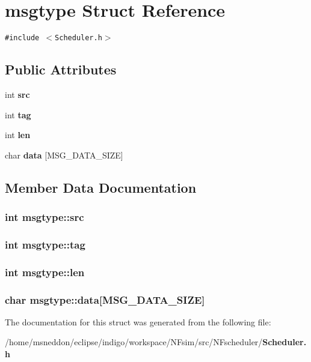 \section{msgtype Struct Reference}
\label{structmsgtype}
{\tt \#include $<$Scheduler.h$>$}

\subsection*{Public Attributes}
\begin{CompactItemize}
\item 
int {\bf src}
\item 
int {\bf tag}
\item 
int {\bf len}
\item 
char {\bf data} [MSG\_\-DATA\_\-SIZE]
\end{CompactItemize}


\subsection{Member Data Documentation}
\subsubsection{\setlength{\rightskip}{0pt plus 5cm}int {\bf msgtype::src}}\label{structmsgtype_4b656660ee0164c9b549aaa46625b65a}


\subsubsection{\setlength{\rightskip}{0pt plus 5cm}int {\bf msgtype::tag}}\label{structmsgtype_2df7fc179d6e3b37e7e11bfc6e24c3a0}


\subsubsection{\setlength{\rightskip}{0pt plus 5cm}int {\bf msgtype::len}}\label{structmsgtype_569c03e4fc5da63dc12c8a307fbbf6ac}


\subsubsection{\setlength{\rightskip}{0pt plus 5cm}char {\bf msgtype::data}[MSG\_\-DATA\_\-SIZE]}\label{structmsgtype_5267931f3097fc678dfa680219da9747}




The documentation for this struct was generated from the following file:\begin{CompactItemize}
\item 
/home/msneddon/eclipse/indigo/workspace/NFsim/src/NFscheduler/{\bf Scheduler.h}\end{CompactItemize}
